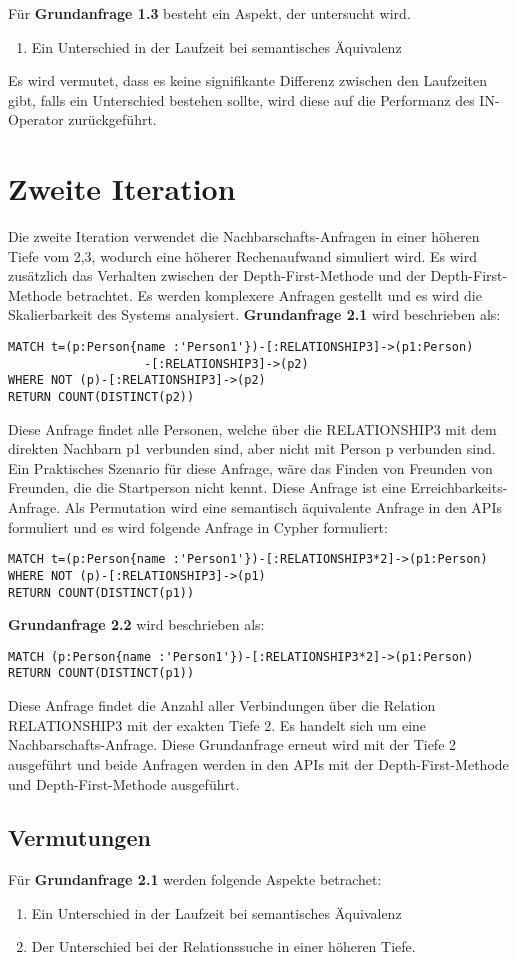 Für \textbf{Grundanfrage 1.3} besteht ein Aspekt, der untersucht wird. 
\begin{enumerate}
	\item Ein Unterschied in der Laufzeit bei  semantisches Äquivalenz  
\end{enumerate}
Es wird vermutet, dass es keine signifikante Differenz zwischen den Laufzeiten gibt, falls ein Unterschied bestehen sollte, wird diese auf die Performanz des IN-Operator zurückgeführt.

\section{Zweite Iteration}
Die zweite Iteration verwendet die Nachbarschafts-Anfragen in einer höheren Tiefe vom 2,3, wodurch eine höherer Rechenaufwand simuliert wird. Es wird zusätzlich das Verhalten zwischen der Depth-First-Methode und der Depth-First-Methode betrachtet. Es werden komplexere Anfragen gestellt und es wird die Skalierbarkeit des Systems analysiert. \newline
\textbf{Grundanfrage 2.1} wird beschrieben als: 
\begin{Verbatim}[frame=single]
MATCH t=(p:Person{name :'Person1'})-[:RELATIONSHIP3]->(p1:Person)
				   -[:RELATIONSHIP3]->(p2)
WHERE NOT (p)-[:RELATIONSHIP3]->(p2) 
RETURN COUNT(DISTINCT(p2))
\end{Verbatim} 
Diese Anfrage findet alle Personen, welche über die RELATIONSHIP3 mit dem direkten Nachbarn  p1 verbunden sind, aber nicht mit Person p verbunden sind. Ein Praktisches Szenario für diese Anfrage, wäre das Finden von Freunden von Freunden, die die Startperson nicht kennt. Diese Anfrage ist eine Erreichbarkeits-Anfrage. Als Permutation wird eine semantisch äquivalente Anfrage in den APIs formuliert und es wird folgende Anfrage in Cypher formuliert:
\begin{Verbatim}[frame=single]
MATCH t=(p:Person{name :'Person1'})-[:RELATIONSHIP3*2]->(p1:Person)
WHERE NOT (p)-[:RELATIONSHIP3]->(p1)
RETURN COUNT(DISTINCT(p1))
\end{Verbatim} 
\textbf{Grundanfrage 2.2} wird beschrieben als: 
\begin{Verbatim}[frame=single]
MATCH (p:Person{name :'Person1'})-[:RELATIONSHIP3*2]->(p1:Person) 
RETURN COUNT(DISTINCT(p1))
\end{Verbatim} 
Diese Anfrage findet die Anzahl aller Verbindungen über die Relation RELATIONSHIP3 mit der exakten Tiefe 2. Es handelt sich um eine Nachbarschafts-Anfrage. Diese Grundanfrage erneut wird mit der Tiefe 2 ausgeführt und beide Anfragen werden in den APIs mit der Depth-First-Methode und Depth-First-Methode ausgeführt. 
\subsection{Vermutungen}
Für \textbf{Grundanfrage 2.1} werden folgende Aspekte betrachet: 
\begin{enumerate}
	\item Ein Unterschied in der Laufzeit bei  semantisches Äquivalenz  
	\item Der Unterschied bei der Relationssuche in einer höheren Tiefe.
\end{enumerate}
